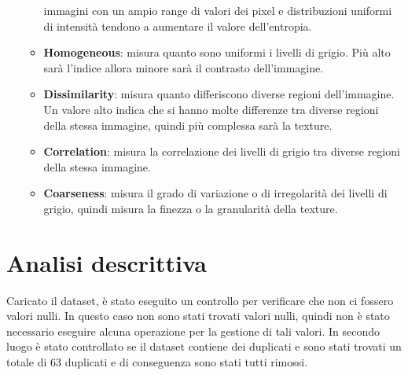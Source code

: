 \begin{enumerate}
\begin{itemize}
                        immagini con un ampio range di valori dei pixel e distribuzioni
                        uniformi di intensità tendono a aumentare il valore dell'entropia.
                  \item \textbf{Homogeneous}: misura quanto sono uniformi i livelli
                        di grigio. Più alto sarà l'indice allora minore sarà il contrasto
                        dell'immagine.
                  \item \textbf{Dissimilarity}: misura quanto differiscono diverse
                        regioni dell'immagine. Un valore alto indica che si hanno molte
                        differenze tra diverse regioni della stessa immagine, quindi più
                        complessa sarà la texture.
                  \item \textbf{Correlation}: misura la correlazione dei livelli
                        di grigio tra diverse regioni della stessa immagine.
                  \item \textbf{Coarseness}: misura il grado di variazione o di
                        irregolarità dei livelli di grigio, quindi misura la finezza o
                        la granularità della texture.
            \end{itemize}
\end{enumerate}

\section{Analisi descrittiva}\label{sec:analisi-descrittiva}

Caricato il dataset, è stato eseguito un controllo per verificare che non ci fossero
valori nulli. In questo caso non sono stati trovati valori nulli, quindi non è
stato necessario eseguire alcuna operazione per la gestione di tali valori. In
secondo luogo è stato controllato se il dataset contiene dei duplicati e sono stati
trovati un totale di $63$ duplicati e di conseguenza sono stati tutti rimossi.

